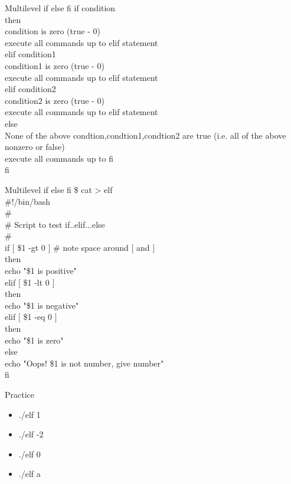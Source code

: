 \documentclass{beamer}
\begin{document}
\begin{frame}{Multilevel if else fi}
if condition \\
then \\
condition is zero (true - 0) \\
execute all commands up to elif statement \\
elif condition1 \\
condition1 is zero (true - 0) \\
execute all commands up to elif statement \\
elif condition2 \\
condition2 is zero (true - 0) \\
execute all commands up to elif statement \\
else \\
None of the above condtion,condtion1,condtion2 are true (i.e. all of the above nonzero or false) \\
execute all commands up to fi \\
fi \\
\end{frame}

\begin{frame}{Multilevel if else fi}
\$ cat > elf  \\
\#!/bin/bash  \\
\#  \\
\# Script to test if..elif...else  \\
\#  \\
if $[$ \$1 -gt 0 $]$  \# note space around $[$ and $]$ \\
then  \\
echo "\$1 is positive"  \\
elif $[$ \$1 -lt 0 $]$  \\
then \\
echo "\$1 is negative"  \\
elif $[$ \$1 -eq 0 $]$ \\
then  \\
echo "\$1 is zero"  \\
else  \\
echo "Oops! \$1 is not number, give number"  \\
fi
\end{frame}

\begin{frame}{Practice}
\begin{itemize}
\item ./elf 1
\item ./elf -2
\item ./elf 0
\item ./elf a
\end{itemize}
\end{frame}
\end{document}
